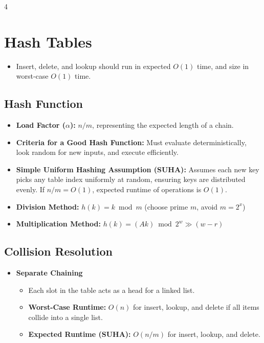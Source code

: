 \documentclass[fontsize=6pt, landscape, a4paper]{scrartcl}
\begin{document}
\begin{multicols*}{4}
    \section*{Hash Tables}
    \begin{itemize}
        \item Insert, delete, and lookup should run in expected $O(1)$ time, and size in
              worst-case $O(1)$ time.
    \end{itemize}

    \subsection*{Hash Function}
    \begin{itemize}
        \item \textbf{Load Factor ($\alpha$):} $n/m$, representing the expected length of a chain.
        \item \textbf{Criteria for a Good Hash Function:} Must evaluate deterministically, look random for new inputs, and execute efficiently.
        \item \textbf{Simple Uniform Hashing Assumption (SUHA):} Assumes each new key picks any table index uniformly at random, ensuring keys are distributed evenly. If $n/m = O(1)$, expected runtime of operations is $O(1)$.
        \item \textbf{Division Method:} $h(k) = k \bmod m$ (choose prime $m$, avoid $m=2^{x}$)
        \item \textbf{Multiplication Method:} $h(k) = (Ak) \bmod 2^{w} \gg (w-r)$
    \end{itemize}

    \subsection*{Collision Resolution}
    \begin{itemize}
        \item \textbf{Separate Chaining}
              \begin{itemize}
                  \item Each slot in the table acts as a head for a linked list.
                  \item \textbf{Worst-Case Runtime:} $O(n)$ for insert, lookup, and delete if all items collide into a single list.
                  \item \textbf{Expected Runtime (SUHA):} $O(n/m)$ for insert, lookup, and delete.
              \end{itemize}


\end{itemize}
\end{multicols*}
\end{document}
